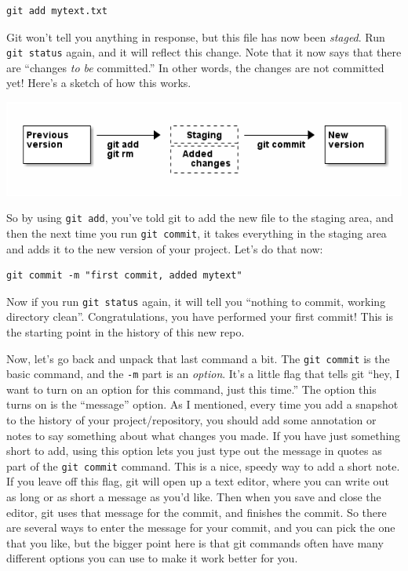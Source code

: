 \documentclass[11pt]{article}
\begin{document}
\begin{verbatim}
git add mytext.txt
\end{verbatim}

Git won't tell you anything in response, but this file has now been \emph{staged}. Run \texttt{git status} again, and it will reflect this change.  Note that it now says that there are ``changes \emph{to be} committed.''  In other words, the changes are not committed yet! Here's a sketch of how this works.



\includegraphics[width=.9\linewidth]{commitflow1.png}

So by using \texttt{git add}, you've told git to add the new file to the staging area, and then the next time you run \texttt{git commit}, it takes everything in the staging area and adds it to the new version of your project.  Let's do that now:


\begin{verbatim}
git commit -m "first commit, added mytext"
\end{verbatim}

Now if you run \texttt{git status} again, it will tell you ``nothing to commit, working directory clean''.  Congratulations, you have performed your first commit!  This is the starting point in the history of this new repo. 

Now, let's go back and unpack that last command a bit. The \texttt{git commit} is the basic command, and the \texttt{-m} part is an \emph{option}. It's a little flag that tells git ``hey, I want to turn on an option for this command, just this time.''  The option this turns on is the ``message'' option. As I mentioned, every time you add a snapshot to the history of your project/repository, you should add some annotation or notes to say something about what changes you made. If you have just something short to add, using this option lets you just type out the message in quotes as part of the \texttt{git commit} command.  This is a nice, speedy way to add a short note.  If you leave off this flag, git will open up a text editor, where you can write out as long or as short a message as you'd like.  Then when you save and close the editor, git uses that message for the commit, and finishes the commit.  So there are several ways to enter the message for your commit, and you can pick the one that you like, but the bigger point here is that git commands often have many different options you can use to make it work better for you.
\end{document}
